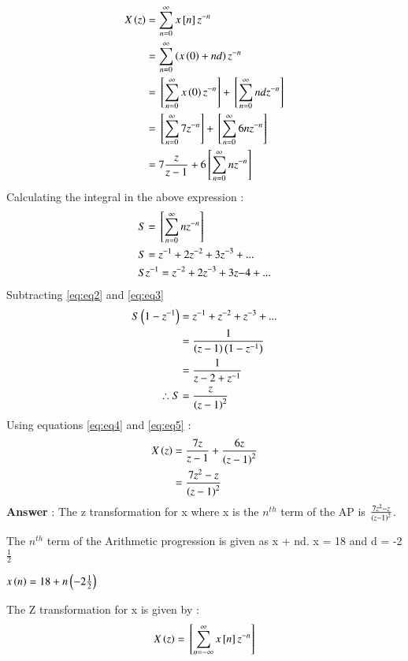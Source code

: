 \documentclass[journal,12pt,twocolumn]{IEEEtran}
\theoremstyle{remark}
\begin{document}
\begin{align}
X\left(z\right) &= \sum_{n=0}^{\infty}x{}\left[n\right]z^{-n}\\
 &= \sum_{n=0}^{\infty}\left(x\left(0\right)+nd\right)z^{-n} \\
 &=  {}\left[\sum_{n=0}^{\infty}x\left(0\right)z^{-n}\right] + {}\left[\sum_{n=0}^{\infty}ndz^{-n}\right]\\
 &=  {}\left[\sum_{n=0}^{\infty}7z^{-n}\right] + {}\left[\sum_{n=0}^{\infty}6nz^{-n}\right]\\
 &= 7\frac{z}{z-1} + 6{}\left[\sum_{n=0}^{\infty}nz^{-n}\right] \label{eq:eq4}
\end{align}
Calculating the integral in the above expression :\\
\begin{align}
&S =  {}\left[\sum_{n=0}^{\infty}nz^{-n}\right]\\ 
&S = z^{-1} + 2z^{-2} + 3z^{-3} + ... \label{eq:eq2}\\
&Sz^{-1} = z^{-2} + 2z^{-3} + 3z{-4} + ... \label{eq:eq3}
\end{align}
Subtracting \eqref{eq:eq2} and \eqref{eq:eq3} \\
\begin{align}
S\left(1-z^{-1}\right) &= z^{-1} + z^{-2} + z^{-3} + ... \\
 &= \frac{1}{\left(z-1\right)\left(1-z^{-1}\right)}\\
 &= \frac{1}{z-2+z^{-1}}\\
\therefore S &= \frac{z}{\left(z-1\right)^2} \label{eq:eq5}
\end{align}
Using equations \eqref{eq:eq4} and \eqref{eq:eq5} :\\
\begin{align}
X\left(z\right) &= \frac{7z}{z-1} + \frac{6z}{\left(z-1\right)^2}\\
 &= \frac{7z^{2}-z}{\left(z-1\right)^2}
\end{align}
\large\textbf{Answer} : \normalsize The z transformation for x where x is the $n^{th}$ term of the AP is $\frac{7z^{2} - z}{\left(z-1\right)^2}$.

\vspace{4mm}

\textbf{} The $n^{th}$ term of the Arithmetic progression is given as x + nd. x = 18 and d = -2$\frac{1}{2}$

$x\left(n\right) = 18 + n\left(-2\frac{1}{2}\right)$

The Z transformation for x is given by : \\
\begin{align}
X\left(z\right) ={}\left[\sum_{n=-\infty}^{\infty}x{}\left[n\right]z^{-n}\right]
\end{align}
\end{document}

